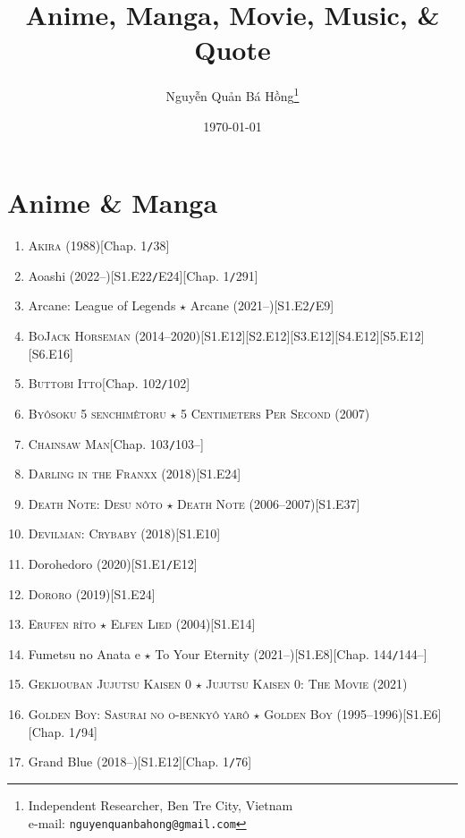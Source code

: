 \documentclass[oneside]{book}
\title{Anime, Manga, Movie, Music, {\large\&} Quote}
\author{\selectlanguage{vietnamese} Nguyễn Quản Bá Hồng\footnote{Independent Researcher, Ben Tre City, Vietnam\\e-mail: \texttt{nguyenquanbahong@gmail.com}}}
\date{\today}
\numberwithin{equation}{section}
\begin{document}
\maketitle
\tableofcontents


\chapter{Anime \& Manga}

\begin{enumerate}
    \item \textsc{Akira} (1988)\hfill[Chap. 1\texttt{/}38]
    \item Aoashi (2022--)\hfill[S1.E22\texttt{/}E24][Chap. 1\texttt{/}291]
    \item Arcane: League of Legends $\star$ Arcane (2021--)\hfill[S1.E2\texttt{/}E9]
    \item \textsc{BoJack Horseman} (2014--2020)\hfill[S1.E12][S2.E12][S3.E12][S4.E12][S5.E12][S6.E16]
    \item \textsc{Buttobi Itto}\hfill[Chap. 102\texttt{/}102]
    \item \textsc{By\^osoku 5 senchimêtoru $\star$ 5 Centimeters Per Second} (2007)
    \item \textsc{Chainsaw Man}\hfill[Chap. 103\texttt{/}103--]
    \item \textsc{Darling in the Franxx} (2018)\hfill[S1.E24]
    \item \textsc{Death Note: Desu n\^oto $\star$ Death Note} (2006--2007)\hfill[S1.E37]
    \item \textsc{Devilman: Crybaby} (2018)\hfill[S1.E10]
    \item Dorohedoro (2020)\hfill[S1.E1\texttt{/}E12]
    \item \textsc{Dororo} (2019)\hfill[S1.E24]
    \item \textsc{Erufen r\^{\i}to $\star$ Elfen Lied} (2004)\hfill[S1.E14]
    \item Fumetsu no Anata e $\star$ To Your Eternity (2021--)\hfill[S1.E8][Chap. 144\texttt{/}144--]
    \item \textsc{Gekijouban Jujutsu Kaisen 0 $\star$ Jujutsu Kaisen 0: The Movie} (2021)
    \item \textsc{Golden Boy: Sasurai no o-benky\^o yar\^o $\star$ Golden Boy} (1995--1996)\hfill[S1.E6][Chap. 1\texttt{/}94]
    \item Grand Blue (2018--)\hfill[S1.E12][Chap. 1\texttt{/}76]

\end{enumerate}
\end{document}
